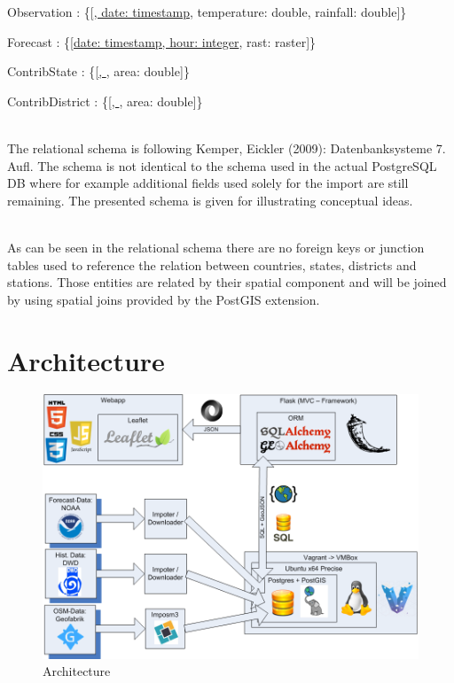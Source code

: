 \documentclass[paper=a4, fontsize=11pt]{scrartcl} %
\numberwithin{equation}{section} %
\numberwithin{figure}{section} %
\numberwithin{table}{section} %
\begin{document}
  Observation : \{{[}\uline{, date: timestamp}, temperature: double, rainfall: double{]}\}

  Forecast : \{{[}\uline{date: timestamp, hour: integer}, rast: raster{]}\}

  ContribState : \{{[}\uline{, }, area: double{]}\}

  ContribDistrict : \{{[}\uline{, }, area: double{]}\}

  ~\\
  The relational schema is following Kemper, Eickler (2009): Datenbanksysteme 7. Aufl. 
  The schema is not identical to the schema used in the actual PostgreSQL DB where for example 
  additional fields used solely for the import are still remaining. The presented
  schema is given for illustrating conceptual ideas. 
  
  ~\\
  As can be seen in the relational schema there are no foreign keys or junction tables
  used to reference the relation between countries, states, districts and stations. 
  Those entities are related by their spatial component and will be joined by using
  spatial joins provided by the PostGIS extension. 





\section{Architecture}
\begin{figure}[htbp]
\includegraphics[width=1\textwidth]{pictures/Architektur.png}
\caption{Architecture}
\end{figure}
\end{document}
